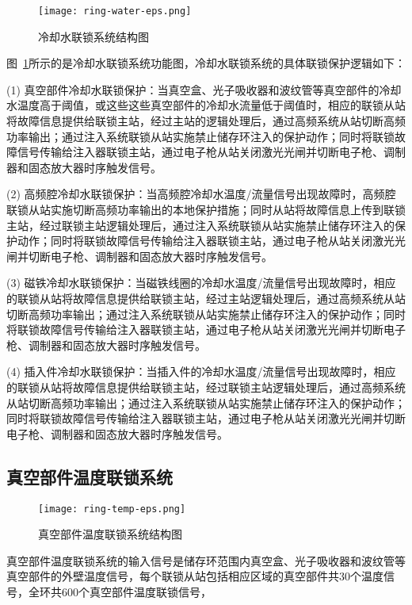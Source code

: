 \begin{figure}[!htb]
	\centering
	\texttt{[image: ring-water-eps.png]}
	\caption{冷却水联锁系统结构图}
	\label{fig:ring-water-eps}
\end{figure}

图~\ref{fig:ring-water-eps}所示的是冷却水联锁系统功能图，冷却水联锁系统的具体联锁保护逻辑如下：

(1) 真空部件冷却水联锁保护：当真空盒、光子吸收器和波纹管等真空部件的冷却水温度高于阈值，或这些这些真空部件的冷却水流量低于阈值时，相应的联锁从站将故障信息提供给联锁主站，经过主站的逻辑处理后，通过高频系统从站切断高频功率输出；通过注入系统联锁从站实施禁止储存环注入的保护动作；同时将联锁故障信号传输给注入器联锁主站，通过电子枪从站关闭激光光闸并切断电子枪、调制器和固态放大器时序触发信号。

(2) 高频腔冷却水联锁保护：当高频腔冷却水温度/流量信号出现故障时，高频腔联锁从站实施切断高频功率输出的本地保护措施；同时从站将故障信息上传到联锁主站，经过联锁主站逻辑处理后，通过注入系统联锁从站实施禁止储存环注入的保护动作；同时将联锁故障信号传输给注入器联锁主站，通过电子枪从站关闭激光光闸并切断电子枪、调制器和固态放大器时序触发信号。

(3) 磁铁冷却水联锁保护：当磁铁线圈的冷却水温度/流量信号出现故障时，相应的联锁从站将故障信息提供给联锁主站，经过主站逻辑处理后，通过高频系统从站切断高频功率输出；通过注入系统联锁从站实施禁止储存环注入的保护动作；同时将联锁故障信号传输给注入器联锁主站，通过电子枪从站关闭激光光闸并切断电子枪、调制器和固态放大器时序触发信号。

(4) 插入件冷却水联锁保护：当插入件的冷却水温度/流量信号出现故障时，相应的联锁从站将故障信息提供给联锁主站，经过联锁主站逻辑处理后，通过高频系统从站切断高频功率输出；通过注入系统联锁从站实施禁止储存环注入的保护动作；同时将联锁故障信号传输给注入器联锁主站，通过电子枪从站关闭激光光闸并切断电子枪、调制器和固态放大器时序触发信号。

\subsection{真空部件温度联锁系统}

\begin{figure}[!htb]
	\centering
	\texttt{[image: ring-temp-eps.png]}
	\caption{真空部件温度联锁系统结构图}
	\label{fig:ring-temp-eps}
\end{figure}

真空部件温度联锁系统的输入信号是储存环范围内真空盒、光子吸收器和波纹管等真空部件的外壁温度信号，每个联锁从站包括相应区域的真空部件共30个温度信号，全环共600个真空部件温度联锁信号，

